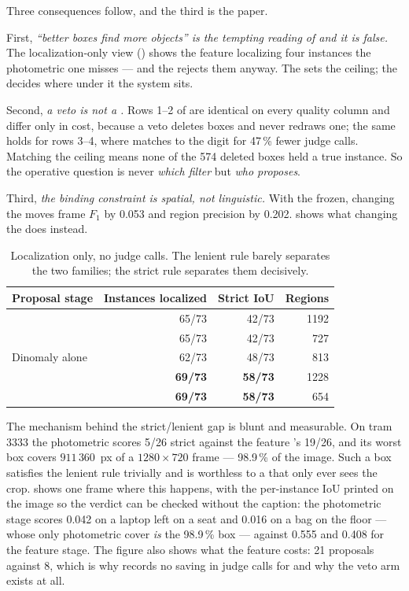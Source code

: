 Three consequences follow, and the third is the paper.

First, \emph{``better boxes find more objects'' is the tempting reading of
 and it is false.} The localization-only view
() shows the feature \proposer{} localizing four
instances the photometric one misses --- and the \judge{} rejects them anyway.
The \proposer{} sets the ceiling; the \judge{} decides where under it the
system sits.

Second, \emph{a veto is not a \proposer{}.} Rows 1--2 of  are
identical on every quality column and differ only in cost, because a veto
deletes boxes and never redraws one; the same holds for rows 3--4, where
\armdinodinomaly{} matches \armdino{} to the digit for 47\,\% fewer judge
calls. Matching the ceiling means none of the 574 deleted boxes held a true
instance. So the operative question is never \emph{which filter} but \emph{who
proposes}.

Third, \emph{the binding constraint is spatial, not linguistic.} With the
\judge{} frozen, changing the \proposer{} moves frame $F_1$ by 0.053 and region
precision by 0.202.  shows what changing the
\judge{} does instead.

\begin{table}[t]
\centering
\caption{Localization only, no judge calls. The lenient rule barely separates
the two families; the strict rule separates them decisively.}
\label{tab:localization}
\begin{tabular}{@{}lrrr@{}}
\toprule
\textbf{Proposal stage} & \textbf{Instances localized} & \textbf{Strict IoU} & \textbf{Regions} \\
\midrule
\armphoto{}             & 65/73 & 42/73 & 1192 \\
\armphotodino{}         & 65/73 & 42/73 &  727 \\
Dinomaly alone          & 62/73 & 48/73 &  813 \\
\armdino{}              & \textbf{69/73} & \textbf{58/73} & 1228 \\
\armdinodinomaly{}      & \textbf{69/73} & \textbf{58/73} &  654 \\
\bottomrule
\end{tabular}
\end{table}

The mechanism behind the strict/lenient gap is blunt and measurable. On tram
3333 the photometric \proposer{} scores 5/26 strict against the feature
\proposer{}'s 19/26, and its worst box covers $911\,360$~px of a
$1280 \times 720$ frame --- 98.9\,\% of the image. Such a box satisfies the
lenient rule trivially and is worthless to a \judge{} that only ever sees the
crop.  shows one frame where this happens, with the
per-instance IoU printed on the image so the verdict can be checked without
the caption: the photometric stage scores 0.042 on a laptop left on a seat and
0.016 on a bag on the floor --- whose only photometric cover \emph{is} the
98.9\,\% box --- against 0.555 and 0.408 for the feature stage. The figure also
shows what the feature \proposer{} costs: 21 proposals against 8, which is why
 records no saving in judge calls for \armdino{} and why the
veto arm exists at all.


